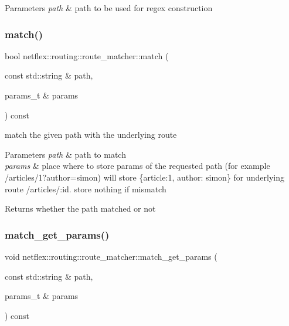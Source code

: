 \begin{DoxyParams}{Parameters}
{\em path} & path to be used for regex construction \\
\hline
\end{DoxyParams}
\mbox{\label{classnetflex_1_1routing_1_1route__matcher_ac0833b3f5d97b427ca9cc35ff95b477b}} 
\subsubsection{\texorpdfstring{match()}{match()}}
{\footnotesize\ttfamily bool netflex\+::routing\+::route\+\_\+matcher\+::match (\begin{DoxyParamCaption}\item[{const std\+::string \&}]{path,  }\item[{params\+\_\+t \&}]{params }\end{DoxyParamCaption}) const}

match the given path with the underlying route


\begin{DoxyParams}{Parameters}
{\em path} & path to match \\
\hline
{\em params} & place where to store params of the requested path (for example /articles/1?author=simon) will store \{article\+:1, author\+: simon\} for underlying route /articles/\+:id. store nothing if mismatch \\
\hline
\end{DoxyParams}
\begin{DoxyReturn}{Returns}
whether the path matched or not 
\end{DoxyReturn}
\mbox{\label{classnetflex_1_1routing_1_1route__matcher_af2cdb76cebb622b34765cedfbdd46cf2}} 
\subsubsection{\texorpdfstring{match\+\_\+get\+\_\+params()}{match\_get\_params()}}
{\footnotesize\ttfamily void netflex\+::routing\+::route\+\_\+matcher\+::match\+\_\+get\+\_\+params (\begin{DoxyParamCaption}\item[{const std\+::string \&}]{path,  }\item[{params\+\_\+t \&}]{params }\end{DoxyParamCaption}) const\hspace{0.3cm}{\ttfamily [protected]}}

